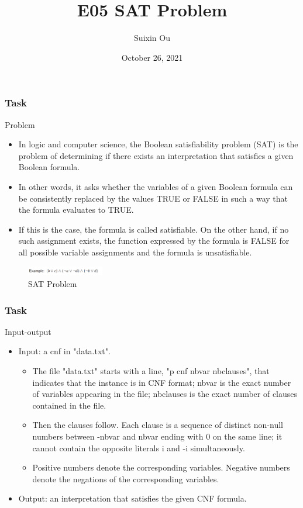 \documentclass{beamer}
\title{E05 SAT Problem}
\author{Suixin Ou} %
\institute[SYSU] %
{
  School of Computer Science\\
  Sun Yat-sen University \\ %
  \medskip
}
\date{October 26, 2021} %
\begin{document}
\begin{frame}
  \titlepage
\end{frame}

\begin{frame}
  \frametitle{Task}
  \begin{block}{Problem}
    \begin{itemize}
      \item In logic and computer science, the Boolean satisfiability problem (SAT) is the problem of determining if there exists an interpretation that satisfies a given Boolean formula.
      \item In other words, it asks whether the variables of a given Boolean formula can be consistently replaced by the values TRUE or FALSE in such a way that the formula evaluates to TRUE.
	  \item If this is the case, the formula is called satisfiable. On the other hand, if no such assignment exists, the function expressed by the formula is FALSE for all possible variable assignments and the formula is unsatisfiable. 
    \end{itemize}
      
    \begin{figure}[ht]
      \centering
      \includegraphics[width=0.3\textwidth]{Pic/example}
      \caption{SAT Problem}
    \end{figure}
  \end{block}
\end{frame}


\begin{frame}
  \frametitle{Task}
  \begin{block}{Input-output}
    \begin{itemize}
      \item Input: a cnf in "data.txt". 

	\begin{itemize}
	      \item The file "data.txt" starts with a line, "p cnf nbvar nbclauses", that indicates that the instance is in CNF format; nbvar is the exact number of variables appearing in the file; nbclauses is the exact number of clauses contained in the file.
	      \item Then the clauses follow. Each clause is a sequence of distinct non-null numbers between -nbvar and nbvar ending with 0 on the same line; it cannot contain the opposite literals i and -i simultaneously. 
		  \item Positive numbers denote the corresponding variables. Negative numbers denote the negations of the corresponding variables.
    \end{itemize}


      \item Output: an interpretation that satisfies the given CNF formula.
    \end{itemize}
  \end{block}
\end{frame}
\end{document}
